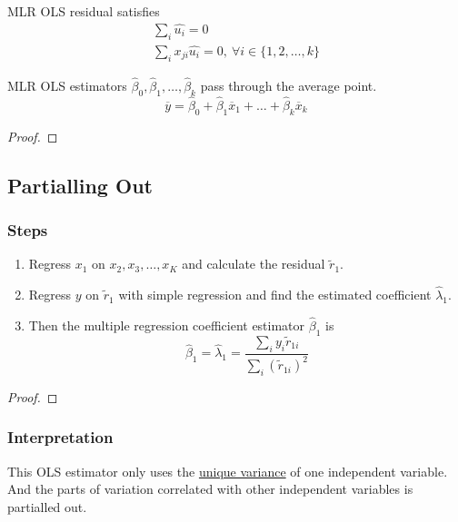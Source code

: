 \documentclass[]{article}
\begin{document}
    \begin{property}
        MLR OLS residual satisfies
        \begin{gather*}
            \sum_i {\hat{u_i}} = 0\\
            \sum_i {x_{ji} \hat{u_i}} = 0,\ \forall i \in \{1, 2, \dots, k\}
        \end{gather*}
    \end{property}
    
    \begin{property}
        MLR OLS estimators $\hat{\beta}_0, \hat{\beta}_1, \dots, \hat{\beta}_k$ pass through the average point.
        \[
            \overline{y} = \hat{\beta}_0 + \hat{\beta}_1 \overline{x}_1 + \dots + \hat{\beta}_k \overline{x}_k
        \]
    \end{property}
    \begin{proof}
    \end{proof}
    
    \subsection{Partialling Out}
    \subsubsection{Steps}
        \begin{enumerate}
            \item Regress $x_1$ on $x_2, x_3, \dots, x_K$ and calculate the residual $\widetilde{r}_1$. 
            \item Regress $y$ on $\widetilde{r}_1$ with simple regression and find the estimated coefficient $\hat{\lambda}_1$.
            \item Then the multiple regression coefficient estimator $\hat{\beta}_1$ is
            \[
                \hat{\beta}_1 = \hat{\lambda}_1 = \frac{\sum_{i}{y_i \widetilde{r}_{1i}}}{\sum_i {(\widetilde{r}_{1i})^2}}
            \]
        \end{enumerate}
        \begin{proof}
        \end{proof}
        
    \subsubsection{Interpretation}
    \par This OLS estimator only uses the \ul{unique variance} of one independent variable. And the parts of variation correlated with other independent variables is partialled out.
    
\end{document}
